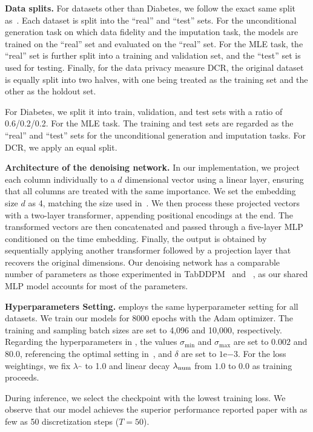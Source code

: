 \textbf{Data splits.} For datasets other than Diabetes, we follow the exact same split as~\cite{zhang2024mixedtype}. Each dataset is split into the ``real'' and ``test'' sets. For the unconditional generation task on which data fidelity and the imputation task, the models are trained on the ``real'' set and evaluated on the ``real'' set. For the MLE task, the ``real'' set is further split into a training and validation set, and the ``test'' set is used for testing. Finally, for the data privacy measure DCR, the original dataset is equally split into two halves, with one being treated as the training set and the other as the holdout set.

For Diabetes, we split it into train, validation, and test sets with a ratio of 0.6/0.2/0.2. For the MLE task. The training and test sets are regarded as the ``real'' and ``test'' sets for the unconditional generation and imputation tasks. For DCR, we apply an equal split.
 
\textbf{Architecture of the denoising network.}
In our implementation, we project each column individually to a $d$ dimensional vector using a linear layer, ensuring that all columns are treated with the same importance. We set the embedding size $d$ as 4, matching the size used in~\citet{zhang2024mixedtype}.  We then process these projected vectors with a two-layer transformer, appending positional encodings at the end. The transformed vectors are then concatenated and passed through a five-layer MLP conditioned on the time embedding. Finally, the output is obtained by sequentially applying another transformer followed by a projection layer that recovers the original dimensions. Our denoising network has a comparable number of parameters as those experimented in TabDDPM~\citep{tabddpm} and \tabsyn~\citep{zhang2024mixedtype}, as our shared MLP model accounts for most of the parameters.

\textbf{Hyperparameters Setting.} \method employs the same hyperparameter setting for all datasets. We train our models for 8000 epochs with the Adam optimizer. The training and sampling batch sizes are set to 4,096 and 10,000, respectively. Regarding the hyperparameters in \method, the values $\sigma_{\text{min}}$ and $\sigma_{\text{max}}$ are set to $0.002$ and $80.0$, referencing the optimal setting in~\citet{edm}, and $\delta$ are set to $1\mathrm{e}{-3}$. For the loss weightings, we fix $\lambda_{\cat}$ to 1.0 and linear decay $\lambda_{{\rm num}}$ from $1.0$ to $0.0$ as training proceeds. 

During inference, we select the checkpoint with the lowest training loss. We observe that our model achieves the superior performance reported paper with as few as 50 discretization steps ($T=50$).

